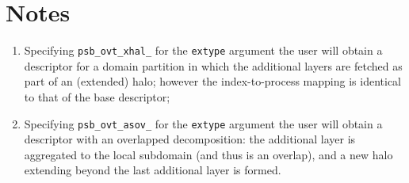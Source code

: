 \section*{Notes}
\begin{enumerate}
\item Specifying \verb|psb_ovt_xhal_| for the \verb|extype| argument
  the user will obtain a descriptor for a domain partition in which
  the additional layers are fetched as part of an (extended) halo;
  however the index-to-process mapping is identical to that of the
  base descriptor;
\item Specifying \verb|psb_ovt_asov_| for the \verb|extype| argument
  the user will obtain a descriptor with an overlapped decomposition:
  the additional layer is aggregated to  the local subdomain (and thus
  is an overlap), and a new halo extending beyond the last additional
  layer is formed. 
\end{enumerate}





